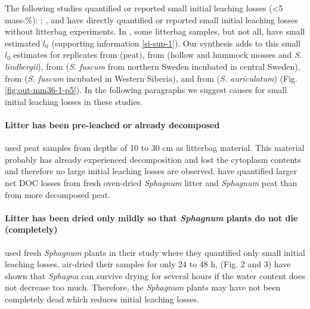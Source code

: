 \documentclass[bg, manuscript]{copernicus}
\begin{document}
The following studies quantified or reported small initial leaching losses (\textless5 mass-\%): \citet{Coulson.1978}; \citet{Thormann.2002}, and \citet{Castells.2005} have directly quantified or reported small initial leaching losses without litterbag experiments. In \citet{Moore.2007}, some litterbag samples, but not all, have small estimated \(l_0\) (supporting information \ref{si-sup-1}). Our synthesis adds to this small \(l_0\) estimates for replicates from \citet{Prevost.1997} (peat), from \citet{Bartsch.1985} (hollow and hummock mosses and \emph{S. lindbergii}), from \citet{Breeuwer.2008} (\emph{S. fuscum} from northern Sweden incubated in central Sweden), from \citet{Golovatskaya.2017} (\emph{S. fuscum} incubated in Western Siberia), and from \citet{Trinder.2008} (\emph{S. auriculatum}) (Fig. \ref{fig:out-mm36-1-p5}). In the following paragraphs we suggest causes for small initial leaching losses in these studies.

\paragraph*{Litter has been pre-leached or already decomposed}

\citet{Prevost.1997} used peat samples from depths of 10 to 30 cm as litterbag material. This material probably has already experienced decomposition and lost the cytoplasm contents and therefore no large initial leaching losses are observed. \citet{Moore.2001} have quantified larger net DOC losses from fresh oven-dried \emph{Sphagnum} litter and \emph{Sphagnum} peat than from more decomposed peat.

\paragraph*{\texorpdfstring{Litter has been dried only mildly so that \emph{Sphagnum} plants do not die (completely)}{Litter has been dried only mildly so that Sphagnum plants do not die (completely)}}

\citet{Castells.2005} used fresh \emph{Sphagnum} plants in their study where they quantified only small initial leaching losses. \citet{Bartsch.1985} air-dried their samples for only 24 to 48 h, \citet{Schipperges.1998} (Fig. 2 and 3) have shown that \emph{Sphagna} can survive drying for several hours if the water content does not decrease too much. Therefore, the \emph{Sphagnum} plants may have not been completely dead which reduces initial leaching losses.
\end{document}
